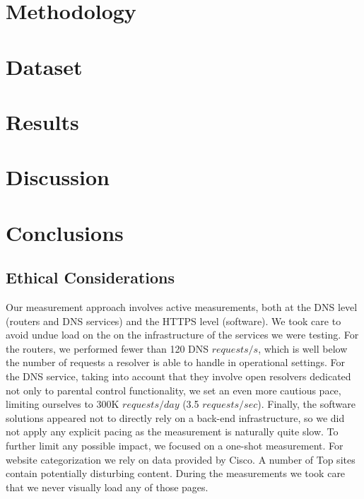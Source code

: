 \documentclass[conference]{IEEEtran}
\begin{document}
\section{Methodology}\label{sec:methodology}
  

\section{Dataset}\label{sec:dataset}


\section{Results}\label{sec:results}
 

\section{Discussion}\label{sec:discussion}


\section{Conclusions}\label{sec:conclusions}
 


 

\appendix

\subsection{Ethical Considerations}
Our measurement approach involves active measurements, both at the DNS level
(routers and DNS services) and the HTTPS level (software). We took care to
avoid undue load on the on the infrastructure of the services we were testing.
For the routers, we performed fewer than 120 DNS $requests/s$, which is
well below the number of requests a resolver is able to handle in operational
settings.
For the DNS service, taking into account that they involve open resolvers
dedicated not only to parental control functionality, we set an even more cautious
pace, limiting ourselves to 300K $requests/day$ (3.5 $requests/sec$).
Finally, the software solutions appeared not to directly rely on a back-end
infrastructure, so we did not apply any explicit pacing as the measurement is
naturally quite slow. To further limit any possible impact, we focused on a
one-shot measurement.
For website categorization we rely on data provided by Cisco. A number of
Top sites contain potentially disturbing content. During the
measurements we took care that we never visually load any of those pages. 
\end{document}
